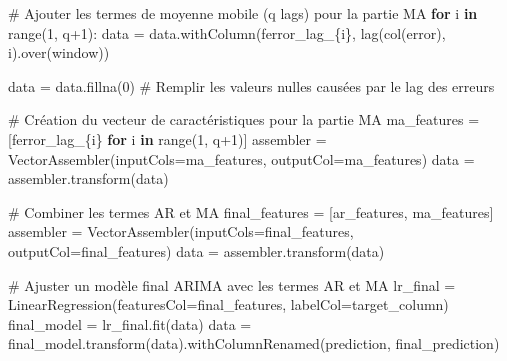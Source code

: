 \documentclass[
  letterpaper,
  DIV=11,
  numbers=noendperiod]{scrartcl}
\newenvironment{Shaded}{\begin{snugshade}}{\end{snugshade}}
\newcommand{\BuiltInTok}[1]{\textcolor[rgb]{0.00,0.23,0.31}{#1}}
\newcommand{\CommentTok}[1]{\textcolor[rgb]{0.37,0.37,0.37}{#1}}
\newcommand{\ControlFlowTok}[1]{\textcolor[rgb]{0.00,0.23,0.31}{\textbf{#1}}}
\newcommand{\DecValTok}[1]{\textcolor[rgb]{0.68,0.00,0.00}{#1}}
\newcommand{\KeywordTok}[1]{\textcolor[rgb]{0.00,0.23,0.31}{\textbf{#1}}}
\newcommand{\NormalTok}[1]{\textcolor[rgb]{0.00,0.23,0.31}{#1}}
\newcommand{\OperatorTok}[1]{\textcolor[rgb]{0.37,0.37,0.37}{#1}}
\newcommand{\SpecialCharTok}[1]{\textcolor[rgb]{0.37,0.37,0.37}{#1}}
\newcommand{\SpecialStringTok}[1]{\textcolor[rgb]{0.13,0.47,0.30}{#1}}
\newcommand{\StringTok}[1]{\textcolor[rgb]{0.13,0.47,0.30}{#1}}
\begin{document}
\begin{Shaded}
\begin{Highlighting}[]
    \CommentTok{\# Ajouter les termes de moyenne mobile (q lags) pour la partie MA}
    \ControlFlowTok{for}\NormalTok{ i }\KeywordTok{in} \BuiltInTok{range}\NormalTok{(}\DecValTok{1}\NormalTok{, q}\OperatorTok{+}\DecValTok{1}\NormalTok{):}
\NormalTok{        data }\OperatorTok{=}\NormalTok{ data.withColumn(}\SpecialStringTok{f\textquotesingle{}error\_lag\_}\SpecialCharTok{\{}\NormalTok{i}\SpecialCharTok{\}}\SpecialStringTok{\textquotesingle{}}\NormalTok{, lag(col(}\StringTok{\textquotesingle{}error\textquotesingle{}}\NormalTok{), i).over(window))}

\NormalTok{    data }\OperatorTok{=}\NormalTok{ data.fillna(}\DecValTok{0}\NormalTok{)  }\CommentTok{\# Remplir les valeurs nulles causées par le lag des erreurs}

    \CommentTok{\# Création du vecteur de caractéristiques pour la partie MA}
\NormalTok{    ma\_features }\OperatorTok{=}\NormalTok{ [}\SpecialStringTok{f\textquotesingle{}error\_lag\_}\SpecialCharTok{\{}\NormalTok{i}\SpecialCharTok{\}}\SpecialStringTok{\textquotesingle{}} \ControlFlowTok{for}\NormalTok{ i }\KeywordTok{in} \BuiltInTok{range}\NormalTok{(}\DecValTok{1}\NormalTok{, q}\OperatorTok{+}\DecValTok{1}\NormalTok{)]}
\NormalTok{    assembler }\OperatorTok{=}\NormalTok{ VectorAssembler(inputCols}\OperatorTok{=}\NormalTok{ma\_features, outputCol}\OperatorTok{=}\StringTok{\textquotesingle{}ma\_features\textquotesingle{}}\NormalTok{)}
\NormalTok{    data }\OperatorTok{=}\NormalTok{ assembler.transform(data)}

    \CommentTok{\# Combiner les termes AR et MA}
\NormalTok{    final\_features }\OperatorTok{=}\NormalTok{ [}\StringTok{\textquotesingle{}ar\_features\textquotesingle{}}\NormalTok{, }\StringTok{\textquotesingle{}ma\_features\textquotesingle{}}\NormalTok{]}
\NormalTok{    assembler }\OperatorTok{=}\NormalTok{ VectorAssembler(inputCols}\OperatorTok{=}\NormalTok{final\_features, outputCol}\OperatorTok{=}\StringTok{\textquotesingle{}final\_features\textquotesingle{}}\NormalTok{)}
\NormalTok{    data }\OperatorTok{=}\NormalTok{ assembler.transform(data)}

    \CommentTok{\# Ajuster un modèle final ARIMA avec les termes AR et MA}
\NormalTok{    lr\_final }\OperatorTok{=}\NormalTok{ LinearRegression(featuresCol}\OperatorTok{=}\StringTok{\textquotesingle{}final\_features\textquotesingle{}}\NormalTok{, labelCol}\OperatorTok{=}\NormalTok{target\_column)}
\NormalTok{    final\_model }\OperatorTok{=}\NormalTok{ lr\_final.fit(data)}
\NormalTok{    data }\OperatorTok{=}\NormalTok{ final\_model.transform(data).withColumnRenamed(}\StringTok{\textquotesingle{}prediction\textquotesingle{}}\NormalTok{, }\StringTok{\textquotesingle{}final\_prediction\textquotesingle{}}\NormalTok{)}


\end{Highlighting}
\end{Shaded}
\end{document}
